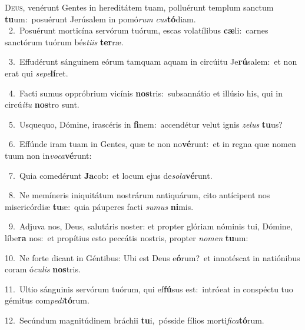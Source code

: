 \lettrine{\initial\textcolor{\initialcolor}{D}}{eus,} venérunt Gentes in hereditátem tuam, polluérunt templum sanctum \textbf{tu}\-um:~\star posuérunt Jerúsalem in pomó\textit{rum} \textit{cus}\-\textbf{tó}diam.\\
{\numbfont\textcolor{\numbcolor}{~2.}}~Posuérunt morticína servórum tuórum, escas volatílibus \textbf{cæ}\-li:~\star carnes sanctórum tuórum bés\-\textit{ti}\-\textit{is} \textbf{ter}\-ræ.\par
{\numbfont\textcolor{\numbcolor}{~3.}}~Effudérunt sánguinem eórum tamquam aquam in circúitu Je\-\textbf{rú}\-salem:~\star et non erat qui \textit{se}\-\textit{pe}\textbf{lí}ret.\par
{\numbfont\textcolor{\numbcolor}{~4.}}~Facti sumus oppróbrium vicínis \textbf{nos}\-tris:~\star subsannátio et illúsio his, qui in circú\-\textit{i}\-\textit{tu} \textbf{nos}\-tro sunt.\par
{\numbfont\textcolor{\numbcolor}{~5.}}~Usquequo, Dómine, irascéris in \textbf{fi}\-nem:~\star accendétur velut ignis \textit{ze}\-\textit{lus} \textbf{tu}\-us?\par
{\numbfont\textcolor{\numbcolor}{~6.}}~Effúnde iram tuam in Gentes, quæ te non no\-\textbf{vé}\-runt:~\star et in regna quæ nomen tuum non in\-\textit{vo}\-\textit{ca}\textbf{vé}runt:\par
{\numbfont\textcolor{\numbcolor}{~7.}}~Quia comedérunt \textbf{Ja}\-cob:~\star et locum ejus de\-\textit{so}\-\textit{la}\textbf{vé}runt.\par
{\numbfont\textcolor{\numbcolor}{~8.}}~Ne memíneris iniquitátum nostrárum antiquárum, cito antícipent nos misericórdiæ \textbf{tu}\-æ:~\star quia páuperes facti \textit{su}\-\textit{mus} \textbf{ni}\-mis.\par
{\numbfont\textcolor{\numbcolor}{~9.}}~Adjuva nos, Deus, salutáris noster: et propter glóriam nóminis tui, Dómine, líbe\textbf{ra} nos:~\star et propítius esto peccátis nostris, propter \textit{no}\-\textit{men} \textbf{tu}\-um:\par
{\numbfont\textcolor{\numbcolor}{10.}}~Ne forte dicant in Géntibus: Ubi est Deus e\-\textbf{ó}\-rum?~\star et innotéscat in natiónibus coram ó\-\textit{cu}\-\textit{lis} \textbf{nos}\-tris.\par
{\numbfont\textcolor{\numbcolor}{11.}}~Ultio sánguinis servórum tuórum, qui ef\-\textbf{fú}\-sus est:~\star intróeat in conspéctu tuo gémitus com\-\textit{pe}\-\textit{di}\textbf{tó}rum.\par
{\numbfont\textcolor{\numbcolor}{12.}}~Secúndum magnitúdinem bráchii \textbf{tu}\-i,~\star pósside fílios morti\-\textit{fi}\-\textit{ca}\textbf{tó}rum.\par
